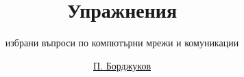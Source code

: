 \documentclass{scrartcl}
\begin{document}
\title{Упражнения}
\subtitle{избрани въпроси по компютърни мрежи и комуникации}
\author{\href{mailto:bordjukov@gmail.com}{П. Борджуков}}
\date{}

\maketitle





\end{document}
